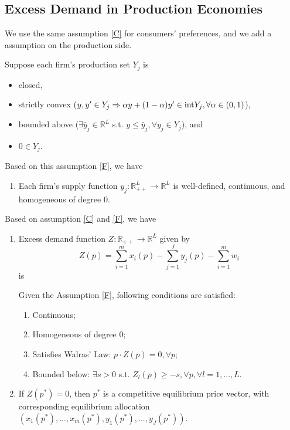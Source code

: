 \documentclass[11pt]{elegantbook}
\begin{document}
\subsection{Excess Demand in Production Economies}
We use the same assumption \ref{C} for consumers' preferences, and we add a assumption on the production side.
\begin{assumption}\label{F}
    Suppose each firm's production set $Y_j$ is
    \begin{itemize}
        \item closed,
        \item strictly convex ($y,y'\in Y_j \Rightarrow \alpha y+(1-\alpha)y'\in \textnormal{int}Y_j, \forall \alpha\in (0,1)$),
        \item bounded above ($\exists \bar{y}_j\in \mathbb{R}^L$ s.t. $y\leq \bar{y}_j, \forall y_j\in Y_j$), and
        \item $0\in Y_j$.
    \end{itemize}
\end{assumption}
Based on this assumption \ref{F}, we have
\begin{enumerate}[$\circ$]
    \item Each firm's supply function $y_j: \mathbb{R}_{++}^L \rightarrow \mathbb{R}^L$ is well-defined, continuous, and homogeneous of degree $0$.
\end{enumerate}
Based on assumption \ref{C} and \ref{F}, we have
\begin{enumerate}[$\circ$]
    \item Excess demand function $Z:\mathbb{R}_{++} \rightarrow \mathbb{R}^L$ given by $$Z(p)=\sum_{i=1}^m x_i(p)-\sum_{j=1}^Jy_j(p)-\sum_{i=1}^m w_i$$ is
    \begin{definition}[Condition (1) to (4)]
        \normalfont
        Given the Assumption \ref{F}, following conditions are satisfied:
        \begin{enumerate}[(1).]
            \item Continuous;
            \item Homogeneous of degree $0$;
            \item Satisfies Walras' Law: $p\cdot Z(p)=0, \forall p$;
            \item Bounded below: $\exists s>0$ s.t. $Z_l(p)\geq -s, \forall p, \forall l=1,...,L$.
        \end{enumerate}
    \end{definition}
    \item If $Z(p^*)=0$, then $p^*$ is a competitive equilibrium price vector, with corresponding equilibrium allocation $\left(x_1(p^*),...,x_m(p^*),y_1(p^*),...,y_J(p^*)\right)$.
\end{enumerate}
\end{document}

